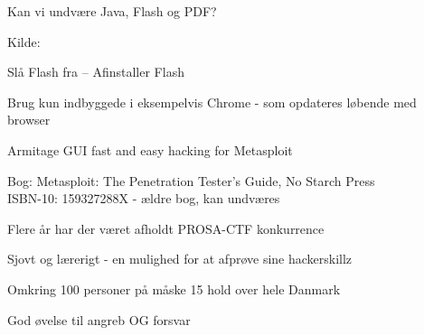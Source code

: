 \documentclass[Screen16to9,17pt]{foils}
\begin{document}


\vskip 1cm
\centerline{Kan vi undvære Java, Flash og PDF?}

Kilde: 





\begin{list1}
\item Slå Flash fra -- Afinstaller Flash
\item Brug kun indbyggede i eksempelvis Chrome - som opdateres løbende med browser
\end{list1}




\centerline{}




\begin{list1}

\item {}
\item Armitage GUI fast and easy hacking for Metasploit\\
\item Bog: Metasploit: The Penetration Tester's Guide, No Starch Press\\
ISBN-10: 159327288X - ældre bog, kan undværes
\end{list1}





\begin{list1}
\item Flere år har der været afholdt PROSA-CTF konkurrence
\item Sjovt og lærerigt - en mulighed for at afprøve sine hackerskillz
\item Omkring 100 personer på måske 15 hold over hele Danmark
\item God øvelse til angreb OG forsvar
\end{list1}
\end{document}
